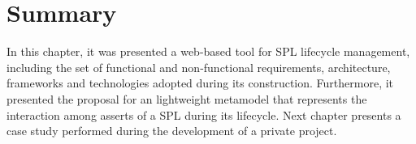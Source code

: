\section{Summary}
\label{sc:splicesummary}

In this chapter, it was presented a web-based tool for \ac{SPL} lifecycle management, including the set of functional and non-functional requirements, architecture, frameworks and technologies adopted during its construction.
Furthermore, it presented the proposal for an lightweight metamodel that represents the interaction among asserts of a \ac{SPL} during its lifecycle.
Next chapter presents a case study performed during the development of a private project.




